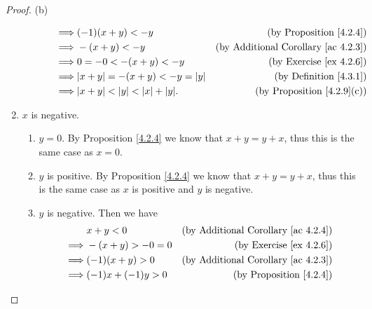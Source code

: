 \begin{proof}{(b)}
\begin{enumerate}[label=(\Roman*)]
\begin{enumerate}[label=(\roman*)]
\begin{enumerate}[label=(\arabic*)]
\begin{align*}
                                      \implies & (-1)(x + y) < -y                               & \text{(by Proposition \ref{4.2.4})}             \\
                                      \implies & -(x + y) < -y                                  & \text{(by Additional Corollary \ref{ac 4.2.3})} \\
                                      \implies & 0 = -0 < -(x + y) < -y                         & \text{(by Exercise \ref{ex 4.2.6})}             \\
                                      \implies & \abs*{x + y} = -(x + y) < -y = \abs*{y}        & \text{(by Definition \ref{4.3.1})}              \\
                                      \implies & \abs*{x + y} < \abs*{y} < \abs*{x} + \abs*{y}. & \text{(by Proposition \ref{4.2.9}(c))}
                                  \end{align*}
                        \end{enumerate}
              \end{enumerate}
        \item \(x\) is negative.
              \begin{enumerate}[label=(\roman*)]
                  \item \(y = 0\).
                        By Proposition \ref{4.2.4} we know that \(x + y = y + x\), thus this is the same case as \(x = 0\).
                  \item \(y\) is positive.
                        By Proposition \ref{4.2.4} we know that \(x + y = y + x\), thus this is the same case as \(x\) is positive and \(y\) is negative.
                  \item \(y\) is negative.
                        Then we have
                        \begin{align*}
                                     & x + y < 0                                         & \text{(by Additional Corollary \ref{ac 4.2.4})} \\
                            \implies & -(x + y) > -0 = 0                                 & \text{(by Exercise \ref{ex 4.2.6})}             \\
                            \implies & (-1)(x + y) > 0                                   & \text{(by Additional Corollary \ref{ac 4.2.3})} \\
                            \implies & (-1)x + (-1)y > 0                                 & \text{(by Proposition \ref{4.2.4})}             \\

\end{align*}
\end{enumerate}
\end{enumerate}
\end{proof}

